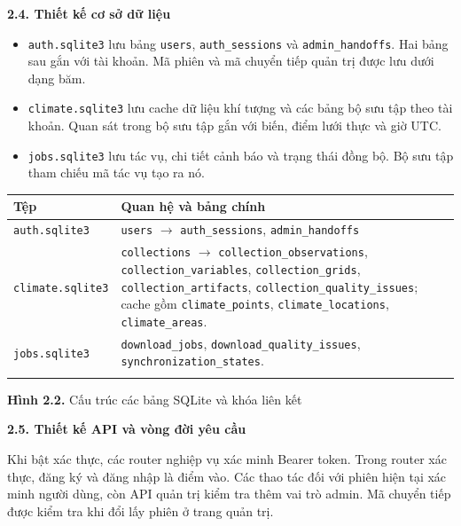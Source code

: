 \documentclass[12pt,a4paper]{article}
\newcommand{\pg}[1]{\newpage\pagenumbering{arabic}\setcounter{page}{#1}\thispagestyle{fancy}}
\newcommand{\heading}[1]{\par\medskip\noindent\textbf{#1}\par\nopagebreak}
\newcommand{\code}[1]{\texttt{#1}}
\newcommand{\captext}[1]{\begin{center}\small #1\end{center}}
\newcommand{\pair}[2]{#1 & #2\\\addlinespace[4pt]}
\begin{document}
\pg{16}
\heading{2.4. Thiết kế cơ sở dữ liệu}
\begin{itemize}
\item \code{auth.sqlite3} lưu bảng \code{users}, \code{auth\_sessions} và \code{admin\_handoffs}. Hai bảng sau gắn với tài khoản. Mã phiên và mã chuyển tiếp quản trị được lưu dưới dạng băm.
\item \code{climate.sqlite3} lưu cache dữ liệu khí tượng và các bảng bộ sưu tập theo tài khoản. Quan sát trong bộ sưu tập gắn với biến, điểm lưới thực và giờ UTC.
\item \code{jobs.sqlite3} lưu tác vụ, chi tiết cảnh báo và trạng thái đồng bộ. Bộ sưu tập tham chiếu mã tác vụ tạo ra nó.
\end{itemize}
\begin{center}\small
\begin{tabularx}{.96\linewidth}{@{}p{.30\linewidth}X@{}}
\toprule Tệp & Quan hệ và bảng chính\\\midrule
\pair{\code{auth.sqlite3}}{\code{users} $\rightarrow$ \code{auth\_sessions}, \code{admin\_handoffs}}
\pair{\code{climate.sqlite3}}{\code{collections} $\rightarrow$ \code{collection\_observations}, \code{collection\_variables}, \code{collection\_grids}, \code{collection\_artifacts}, \code{collection\_quality\_issues}; cache gồm \code{climate\_points}, \code{climate\_locations}, \code{climate\_areas}.}
\pair{\code{jobs.sqlite3}}{\code{download\_jobs}, \code{download\_quality\_issues}, \code{synchronization\_states}.}
\bottomrule
\end{tabularx}
\end{center}
\captext{\textbf{Hình 2.2.} Cấu trúc các bảng SQLite và khóa liên kết}
\heading{2.5. Thiết kế API và vòng đời yêu cầu}
Khi bật xác thực, các router nghiệp vụ xác minh Bearer token. Trong router xác thực, đăng ký và đăng nhập là điểm vào. Các thao tác đối với phiên hiện tại xác minh người dùng, còn API quản trị kiểm tra thêm vai trò admin. Mã chuyển tiếp được kiểm tra khi đổi lấy phiên ở trang quản trị.
\end{document}
